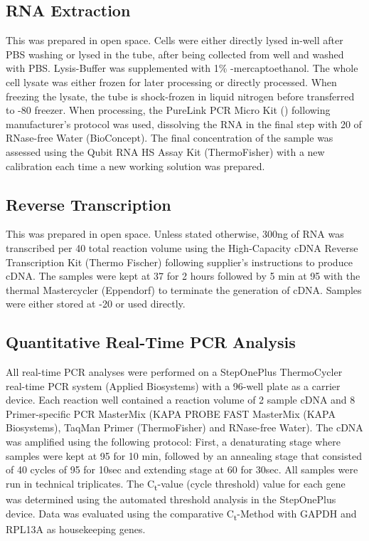 \subsection{RNA Extraction}
This was prepared in open space. Cells were either directly lysed in-well after PBS washing or lysed in the tube, after being collected from well and washed with PBS. Lysis-Buffer was supplemented with 1\% \textbeta-mercaptoethanol. The whole cell lysate was either frozen for later processing or directly processed. When freezing the lysate, the tube is shock-frozen in liquid nitrogen before transferred to -80 \degC freezer. When processing, the PureLink PCR Micro Kit () following manufacturer's protocol was used, dissolving the RNA in the final step with 20\mul{} of RNase-free Water (BioConcept). The final concentration of the sample was assessed using the Qubit RNA HS Assay Kit (ThermoFisher) with a new calibration each time a new working solution was prepared.

\subsection{Reverse Transcription}
This was prepared in open space. Unless stated otherwise, 300ng of RNA was transcribed per 40\mul{} total reaction volume using the High-Capacity cDNA Reverse Transcription Kit (Thermo Fischer) following supplier's instructions to produce cDNA. The samples were kept at 37 \degC for 2 hours followed by 5 min at 95 \degC with the thermal Mastercycler (Eppendorf) to terminate the generation of cDNA. Samples were either stored at -20 \degC or used directly. 

\subsection{Quantitative Real-Time PCR Analysis}
All real-time PCR analyses were performed on a StepOnePlus ThermoCycler real-time PCR system (Applied Biosystems) with a 96-well plate as a carrier device. Each reaction well contained a reaction volume of 2\mul{} sample cDNA and 8\mul{} Primer-specific PCR MasterMix (KAPA PROBE FAST MasterMix (KAPA Biosystems), TaqMan\textregistered{} Primer (ThermoFisher) and RNase-free Water). The cDNA was amplified using the following protocol: First, a denaturating stage where samples were kept at 95 \degC for 10
min, followed by an annealing stage that consisted of 40 cycles of 95 \degC for 10sec and extending stage at 60 \degC for 30sec. All samples were run in technical triplicates. The C\textsubscript{t}-value (cycle threshold) value for each gene was determined using the automated threshold analysis in the StepOnePlus device. Data was evaluated using the comparative C\textsubscript{t}-Method with GAPDH and RPL13A as housekeeping genes.

